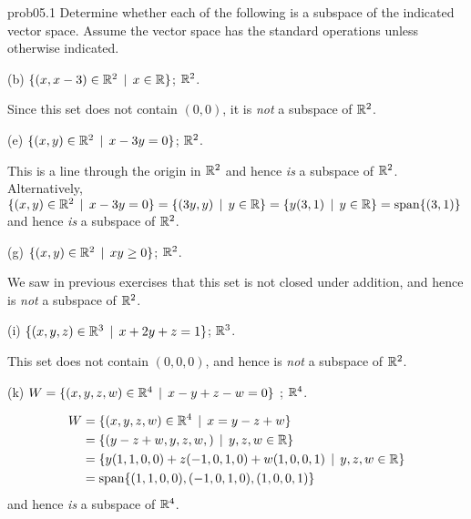 
\begin{sol}{prob05.1} Determine whether each of the following is a subspace of the indicated vector space. Assume the vector space has the standard operations unless otherwise indicated. 


\medskip

(b)  $\{(x, x-3) \in \mathbb{R}^2\,\mid \, x\in \mathbb{R} \}$; $\mathbb{R}^2$. 

\soln Since this set does not contain $(0,0)$, it is {\it not} a subspace of $\mathbb{R}^2$.
\medskip


(e)  $\{(x, y) \in \mathbb{R}^2\,\mid \, x -3y=0  \}$;   $\mathbb{R}^2$. 

\soln This is a line through the origin in $\mathbb{R}^2$ and hence {\it is} a subspace of $\mathbb{R}^2$. Alternatively,$\{(x, y) \in \mathbb{R}^2\,\mid \, x -3y=0  \}=\{(3y, y) \,\mid \, y\in \mathbb{R}  \}=\{y(3,1)\,\mid \, y\in \mathbb{R} \}=\textrm{span}\{(3,1)\}$ and hence {\it is} a subspace of $\mathbb{R}^2$.\medskip
%

(g)  $\{(x, y) \in \mathbb{R}^2\,\mid \, xy \ge 0  \}$; $\mathbb{R}^2$. 

\soln We saw in previous exercises that this set is not closed under addition, and hence is {\it not} a subspace of $\mathbb{R}^2$.\medskip
%

(i)   $\{(x, y, z) \in \mathbb{R}^3\,\mid \, x+2y+z=1  \}$;    $\mathbb{R}^3$. 

\soln This set does not contain $(0,0,0)$, and hence is {\it not} a subspace of $\mathbb{R}^2$.\medskip 
%
 

(k) $W=\{(x, y, z, w) \in \mathbb{R}^4\,\mid \, x-y+z-w=0  \}$ ; $\mathbb{R}^4$. 

\soln 
\begin{align*}
W&=\{(x, y, z, w) \in \mathbb{R}^4\,\mid \, x=y-z+w \}\\
&=\{(y-z+w, y,z,w,)\,\mid \, y,z,w\in \mathbb{R} \}\\
&=\{y(1,1,0,0)+z(-1, 0,1,0)+w(1,0,0,1)\,\mid \, y,z,w\in \mathbb{R} \}\\
&=\textrm{span}\{(1,1,0,0),(-1, 0,1,0),(1,0,0,1) \}
\end{align*}
and hence {\it is} a subspace of $\mathbb{R}^4$.  \medskip

\end{sol}

